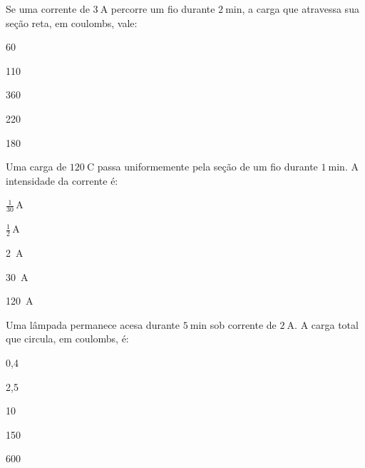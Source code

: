 \blocofixacao
\begin{questao}[1]{}

Se uma corrente de $\SI{3}{\ampere}$ percorre um fio durante $\SI{2}{\minute}$, a
carga que atravessa sua seção reta, em coulombs, vale:
\begin{alternativas}[3]
\item 60
\item 110
\item 360
\item 220
\item 180
\end{alternativas}


\end{questao}
\begin{questao}[1]{}

Uma carga de $\SI{120}{\coulomb}$ passa uniformemente pela seção de um fio durante
$\SI{1}{\minute}$. A intensidade da corrente é:
\begin{alternativas}[3]
\item $\tfrac{1}{30}\,\si{\ampere}$
\item $\tfrac{1}{2}\,\si{\ampere}$
\item \SI{2}{\ampere}
\item \SI{30}{\ampere}
\item \SI{120}{\ampere}
\end{alternativas}


\end{questao}
\begin{questao}[1]{}

Uma lâmpada permanece acesa durante $\SI{5}{\minute}$ sob corrente de
$\SI{2}{\ampere}$. A carga total que circula, em coulombs, é:
\begin{alternativas}[3]
\item 0,4
\item 2,5
\item 10
\item 150
\item 600
\end{alternativas}


\end{questao}

